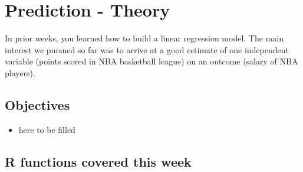 \documentclass[
]{book}
\providecommand{\tightlist}{%
  \setlength{\itemsep}{0pt}\setlength{\parskip}{0pt}}
\begin{document}
\hypertarget{pm-t}{%
\chapter{Prediction - Theory}\label{pm-t}}

In prior weeks, you learned how to build a linear regression model. The main interest
we pursued so far was to arrive at a good estimate of one independent variable (points scored in NBA basketball league) on an outcome (salary of NBA players).

\hypertarget{objectives-7}{%
\section{Objectives}\label{objectives-7}}

\begin{itemize}
\tightlist
\item
  here to be filled
\end{itemize}

\hypertarget{r-functions-covered-this-week-3}{%
\section{R functions covered this week}\label{r-functions-covered-this-week-3}}
\end{document}
